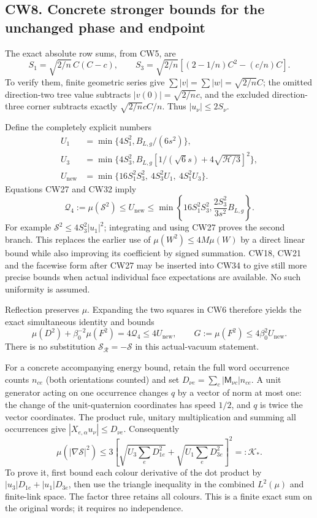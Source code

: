 \documentclass[11pt]{article}
\begin{document}
\subsection*{CW8. Concrete stronger bounds for the unchanged phase and endpoint}

The exact absolute row sums, from CW5, are
\[
 S_1=\sqrt{2/n}\,C(C-c),\qquad
 S_3=\sqrt{2/n}[(2-1/n)C^2-(c/n)C].                       \tag{CW33}
\]
To verify them, finite geometric series give
\(\sum|v|=\sum|w|=\sqrt{2/n}C\); the omitted direction-two
tree value subtracts \(|v(0)|=\sqrt{2/n}c\), and the excluded
direction-three corner subtracts exactly
\(\sqrt{2/n}cC/n\). Thus \(|u_\nu|\le2S_\nu\).

Define the completely explicit numbers
\[
 \begin{aligned}
 U_1&=\min\{4S_1^2,B_{L,g}/(6s^2)\},\\
 U_3&=\min\{4S_3^2,
 B_{L,g}[1/(\sqrt6s)+4\sqrt{\mathcal H/3}]^2\},\\
 U_{\mathrm{new}}&=\min\{16S_1^2S_3^2,\ 4S_3^2U_1,\ 4S_1^2U_3\}.
 \end{aligned}                                                 \tag{CW34}
\]
Equations CW27 and CW32 imply
\[
 \boxed{\mathcal Q_4:=\mu(\mathcal S^2)\le U_{\mathrm{new}}
 \le\min\left\{16S_1^2S_3^2,
                \frac{2S_3^2}{3s^2}B_{L,g}\right\}.}     \tag{CW35}
\]
For example \(\mathcal S^2\le4S_3^2|u_1|^2\); integrating
and using CW27 proves the second branch. This replaces the
earlier use of \(\mu(W^2)\le4M\mu(W)\) by a direct linear
bound while also improving its coefficient by signed summation.
CW18, CW21 and the facewise form after CW27 may be inserted into
CW34 to give still more precise bounds when actual individual
face expectations are available. No such uniformity is assumed.

Reflection preserves \(\mu\). Expanding the two squares in CW6
therefore yields the exact simultaneous identity and bounds
\[
 \boxed{\mu(D^2)+\beta_0^{-2}\mu(F^2)=4\mathcal Q_4
 \le4U_{\mathrm{new}},\qquad
 G:=\mu(F^2)\le4\beta_0^2U_{\mathrm{new}}.}                \tag{CW36}
\]
There is no substitution \(\mathcal S_{\mathcal R}=-\mathcal S\)
in this actual-vacuum statement.

For a concrete accompanying energy bound, retain the full word
occurrence counts \(n_{ce}\) (both orientations counted) and set
\(D_{\nu e}=\sum_c|\mathsf M_{\nu c}|n_{ce}\). A unit generator
acting on one occurrence changes \(q\) by a vector of norm at
most one: the change of the unit-quaternion coordinates has
speed \(1/2\), and \(q\) is twice the vector coordinates.
The product rule, unitary multiplication and summing all
occurrences give \(|X_{e,\alpha}u_\nu|\le D_{\nu e}\).
Consequently
\[
 \mu(|\nabla\mathcal S|^2)
 \le3\left[\sqrt{U_3\sum_eD_{1e}^2}
           +\sqrt{U_1\sum_eD_{3e}^2}\right]^2=:\mathcal K_*.
                                                               \tag{CW37}
\]
To prove it, first bound each colour derivative of the dot
product by \(|u_3|D_{1e}+|u_1|D_{3e}\), then use the triangle
inequality in the combined \(L^2(\mu)\) and finite-link space.
The factor three retains all colours. This is a finite exact
sum on the original words; it requires no independence.
\end{document}
